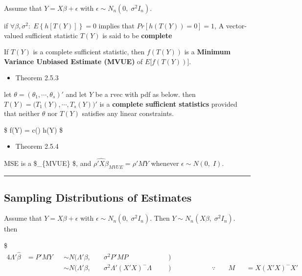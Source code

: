 \documentclass[
]{book}
\providecommand{\tightlist}{%
  \setlength{\itemsep}{0pt}\setlength{\parskip}{0pt}}
\begin{document}
{{{Assume that \(Y = X \beta + \epsilon\) with \(\epsilon \sim N_n(0, \; \sigma^2 I_n)\).

if \(\forall \beta, \sigma^2: \; E \left \{h[T(Y)] \right\} = 0\) implies that \(Pr[h(T(Y)) = 0] = 1\), A vector-valued sufficient statistic \(T(Y)\) is said to be \textbf{complete}

If \(T(Y)\) is a complete sufficient statistic, then \(f(T(Y))\) is a \textbf{Minimum Variance Unbiased Estimate (MVUE)} of \(E \Big [ f (T(Y)) \Big ]\).

\begin{itemize}
\tightlist
\item
  Theorem 2.5.3
\end{itemize}

let \(\theta = (\theta_1 , \cdots, \theta_s)'\) and let \(Y\) be a rvec with pdf as below. then \(T(Y) = \Big( T_1(Y), \cdots, T_s(Y) \Big)'\) is a \textbf{complete sufficient statistics} provided that neither \(\theta\) nor \(T(Y)\) satisfies any linear constraints.

\$
f(Y) = c(\theta) \exp \left[ \sum_{i=1}^s \theta_i T_i (Y) \right] h(Y)
\$

\begin{itemize}
\tightlist
\item
  Theorem 2.5.4
\end{itemize}

MSE is a \$\_\{MVUE\} \$, and \(\hat { \rho ' X \beta }_{MVUE} = \rho ' M Y\) whenever \(\epsilon \sim N(0, \; I)\).

\begin{center}\rule{0.5\linewidth}{0.5pt}\end{center}

\hypertarget{sampling-distributions-of-estimates}{%
\subsection{Sampling Distributions of Estimates}\label{sampling-distributions-of-estimates}}

Assume that \(Y = X \beta + \epsilon\) with \(\epsilon \sim N_n(0, \; \sigma^2 I_n)\). Then \(Y \sim N_n(X \beta, \; \sigma^2 I_n)\). then

\$
\begin{alignat}{4}
\Lambda ' \hat \beta &= P' M Y &&\sim N(\Lambda ' \beta , \; &&\sigma^2 P'MP&&\; \; \; ) && \; \; \; \; \; \; \; \; \; \;&& && &&  \\


& &&\sim N(\Lambda ' \beta , \; &&\sigma^2 \Lambda ' (X'X)^{-} \Lambda&&\; \; \; ) &&    && \because && \;M && =X(X'X)^- X' \\




\end{alignat}}}}
\end{document}
